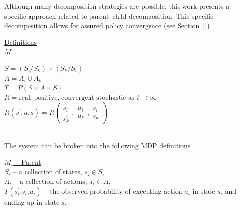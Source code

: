 \begin{center}
\end{center}


\newpage


Although many decomposition strategies are possible, this work presents a specific approach related to parent--child decomposition. This specific decomposition allows for assured policy convergence (see Section~\ref{})

\underline{Definitions}\\

\underline{$M$}\quad
\begin{minipage}[t]{5in}
$S=(S_i/S_k)\times(S_k/S_i)$\\
$A=A_i\cup A_k$\\
$T=P(S\times A\times S)$\\
$R= \text{real, positive, convergent stochastic as $t\to\infty$}$\\
$R(s^\prime,a,s) =R\left( 
\begin{array}{c} s^\prime_i \\ s^\prime_k \end{array},
\begin{array}{c} a_i \\ a_k \end{array},
\begin{array}{c} s_i \\ s_k \end{array}
\right)$
\end{minipage}\\

The system can be broken into the following MDP definitions

\underline{$M_i$ -- Parent}\\

$S_i$ -- a collection of states, $s_i\in S_i$\\
$A_i$ -- a collection of actions, $a_i \in A_i$\\
$\tilde{T}( s^\prime_i | s_i, a_i )$ -- the observed probability of executing action $a_i$ in state $s_i$ and ending up in state $s^\prime_i$\\

